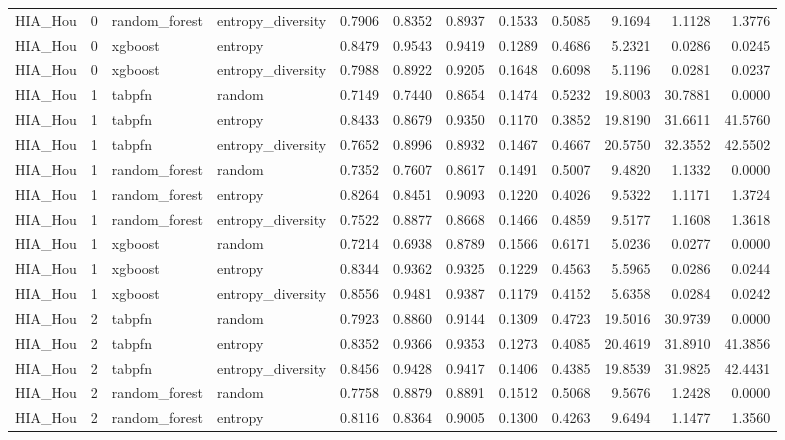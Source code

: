 \begin{tabular}{lrllrrrrrrrr}
HIA_Hou & 0 & random_forest & entropy_diversity & 0.7906 & 0.8352 & 0.8937 & 0.1533 & 0.5085 & 9.1694 & 1.1128 & 1.3776 \\
HIA_Hou & 0 & xgboost & entropy & 0.8479 & 0.9543 & 0.9419 & 0.1289 & 0.4686 & 5.2321 & 0.0286 & 0.0245 \\
HIA_Hou & 0 & xgboost & entropy_diversity & 0.7988 & 0.8922 & 0.9205 & 0.1648 & 0.6098 & 5.1196 & 0.0281 & 0.0237 \\
HIA_Hou & 1 & tabpfn & random & 0.7149 & 0.7440 & 0.8654 & 0.1474 & 0.5232 & 19.8003 & 30.7881 & 0.0000 \\
HIA_Hou & 1 & tabpfn & entropy & 0.8433 & 0.8679 & 0.9350 & 0.1170 & 0.3852 & 19.8190 & 31.6611 & 41.5760 \\
HIA_Hou & 1 & tabpfn & entropy_diversity & 0.7652 & 0.8996 & 0.8932 & 0.1467 & 0.4667 & 20.5750 & 32.3552 & 42.5502 \\
HIA_Hou & 1 & random_forest & random & 0.7352 & 0.7607 & 0.8617 & 0.1491 & 0.5007 & 9.4820 & 1.1332 & 0.0000 \\
HIA_Hou & 1 & random_forest & entropy & 0.8264 & 0.8451 & 0.9093 & 0.1220 & 0.4026 & 9.5322 & 1.1171 & 1.3724 \\
HIA_Hou & 1 & random_forest & entropy_diversity & 0.7522 & 0.8877 & 0.8668 & 0.1466 & 0.4859 & 9.5177 & 1.1608 & 1.3618 \\
HIA_Hou & 1 & xgboost & random & 0.7214 & 0.6938 & 0.8789 & 0.1566 & 0.6171 & 5.0236 & 0.0277 & 0.0000 \\
HIA_Hou & 1 & xgboost & entropy & 0.8344 & 0.9362 & 0.9325 & 0.1229 & 0.4563 & 5.5965 & 0.0286 & 0.0244 \\
HIA_Hou & 1 & xgboost & entropy_diversity & 0.8556 & 0.9481 & 0.9387 & 0.1179 & 0.4152 & 5.6358 & 0.0284 & 0.0242 \\
HIA_Hou & 2 & tabpfn & random & 0.7923 & 0.8860 & 0.9144 & 0.1309 & 0.4723 & 19.5016 & 30.9739 & 0.0000 \\
HIA_Hou & 2 & tabpfn & entropy & 0.8352 & 0.9366 & 0.9353 & 0.1273 & 0.4085 & 20.4619 & 31.8910 & 41.3856 \\
HIA_Hou & 2 & tabpfn & entropy_diversity & 0.8456 & 0.9428 & 0.9417 & 0.1406 & 0.4385 & 19.8539 & 31.9825 & 42.4431 \\
HIA_Hou & 2 & random_forest & random & 0.7758 & 0.8879 & 0.8891 & 0.1512 & 0.5068 & 9.5676 & 1.2428 & 0.0000 \\
HIA_Hou & 2 & random_forest & entropy & 0.8116 & 0.8364 & 0.9005 & 0.1300 & 0.4263 & 9.6494 & 1.1477 & 1.3560 \\

\end{tabular}
